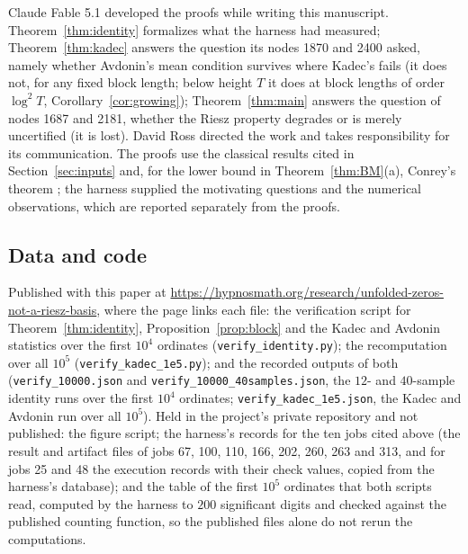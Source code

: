 \documentclass[11pt]{article}
\begin{document}
Claude Fable 5.1 developed the proofs while writing this manuscript. Theorem~\ref{thm:identity} formalizes what the harness had measured; Theorem~\ref{thm:kadec} answers the question its nodes 1870 and 2400 asked, namely whether Avdonin's mean condition survives where Kadec's fails (it does not, for any fixed block length; below height $T$ it does at block lengths of order $\log^2T$, Corollary~\ref{cor:growing}); Theorem~\ref{thm:main} answers the question of nodes 1687 and 2181, whether the Riesz property degrades or is merely uncertified (it is lost). David Ross directed the work and takes responsibility for its communication. The proofs use the classical results cited in Section~\ref{sec:inputs} and, for the lower bound in Theorem~\ref{thm:BM}(a), Conrey's theorem \cite{Conrey89}; the harness supplied the motivating questions and the numerical observations, which are reported separately from the proofs.

\subsection*{Data and code}
Published with this paper at \url{https://hypnosmath.org/research/unfolded-zeros-not-a-riesz-basis}, where the page links each file: the verification script for Theorem~\ref{thm:identity}, Proposition~\ref{prop:block} and the Kadec and Avdonin statistics over the first $10^4$ ordinates (\texttt{verify\_identity.py}); the recomputation over all $10^5$ (\texttt{verify\_kadec\_1e5.py}); and the recorded outputs of both (\texttt{verify\_10000.json} and \texttt{verify\_10000\_40samples.json}, the $12$- and $40$-sample identity runs over the first $10^4$ ordinates; \texttt{verify\_kadec\_1e5.json}, the Kadec and Avdonin run over all $10^5$). Held in the project's private repository and not published: the figure script; the harness's records for the ten jobs cited above (the result and artifact files of jobs 67, 100, 110, 166, 202, 260, 263 and 313, and for jobs 25 and 48 the execution records with their check values, copied from the harness's database); and the table of the first $10^5$ ordinates that both scripts read, computed by the harness to $200$ significant digits and checked against the published counting function, so the published files alone do not rerun the computations.
\end{document}
